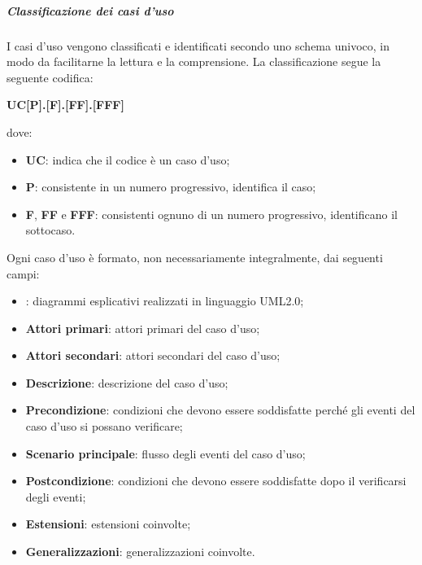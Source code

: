 \documentclass[../norme-di-progetto.tex]{subfiles}
\begin{document}
\subparagraph{Classificazione dei casi d'uso}
I casi d'uso vengono classificati e identificati secondo uno schema univoco, in modo da facilitarne la lettura e la comprensione. La classificazione segue la seguente codifica: \\
\begin{center}
  \centering
  \textbf{UC[P].[F].[FF].[FFF]}
\end{center} dove:
\begin{itemize}
  \item \textbf{UC}: indica che il codice è un caso d'uso;
  \item \textbf{P}: consistente in un numero progressivo, identifica il caso;
  \item \textbf{F}, \textbf{FF} e \textbf{FFF}: consistenti ognuno di un numero progressivo, identificano il sottocaso.
\end{itemize}
Ogni caso d'uso è formato, non necessariamente integralmente, dai seguenti campi:
\begin{itemize}
  \item \textbf{}: diagrammi esplicativi realizzati in linguaggio UML2.0;
  \item \textbf{Attori primari}: attori primari del caso d'uso;
  \item \textbf{Attori secondari}: attori secondari del caso d'uso;
  \item \textbf{Descrizione}: descrizione del caso d'uso;
  \item \textbf{Precondizione}: condizioni che devono essere soddisfatte perché gli eventi del caso d'uso si possano verificare;
  \item \textbf{Scenario principale}: flusso degli eventi del caso d'uso;
  \item \textbf{Postcondizione}: condizioni che devono essere soddisfatte dopo il verificarsi degli eventi;
  \item \textbf{Estensioni}: estensioni coinvolte;
  \item \textbf{Generalizzazioni}: generalizzazioni coinvolte.
\end{itemize}
\end{document}
